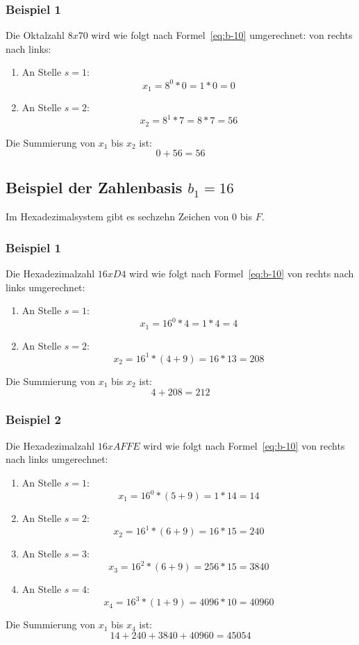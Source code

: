 \subsubsection{Beispiel 1}
Die Oktalzahl $8x70$ wird wie folgt nach Formel~\ref{eq:b-10} umgerechnet: von rechts nach links:
\begin{enumerate}
    \item An Stelle $s=1$: \[x_{1} = 8^{0} * 0 = 1 * 0 = 0\]
    \item An Stelle $s=2$: \[x_{2} = 8^{1} * 7 = 8 * 7 = 56\]
\end{enumerate}
Die Summierung von $x_{1}$ bis $x_{2}$ ist:
\[0 + 56 = 56\]
\subsection{Beispiel der Zahlenbasis $b_{1}=16$}
Im Hexadezimalsystem gibt es sechzehn Zeichen von 0 bis $F$.
\subsubsection{Beispiel 1}
Die Hexadezimalzahl $16xD4$ wird wie folgt nach Formel~\ref{eq:b-10} von rechts nach links umgerechnet:
\begin{enumerate}
    \item An Stelle $s=1$: \[x_{1} = 16^{0} * 4 = 1 * 4 = 4\]
    \item An Stelle $s=2$: \[x_{2} = 16^{1} * (4 + 9) = 16 * 13 = 208\]
\end{enumerate}
Die Summierung von $x_{1}$ bis $x_{2}$ ist:
\[4 + 208 = 212\]
\subsubsection{Beispiel 2}
Die Hexadezimalzahl $16xAFFE$ wird wie folgt nach Formel~\ref{eq:b-10} von rechts nach links umgerechnet:
\begin{enumerate}
    \item An Stelle $s=1$: \[x_{1} = 16^{0} * (5 + 9) = 1 * 14 = 14\]
    \item An Stelle $s=2$: \[x_{2} = 16^{1} * (6 + 9) = 16 * 15 = 240\]
    \item An Stelle $s=3$: \[x_{3} = 16^{2} * (6 + 9) = 256 * 15 = 3840\]
    \item An Stelle $s=4$: \[x_{4} = 16^{3} * (1 + 9) = 4096 * 10 = 40960\]
\end{enumerate}
Die Summierung von $x_{1}$ bis $x_{4}$ ist:
\[14 + 240 + 3840 + 40960 = 45054\]

